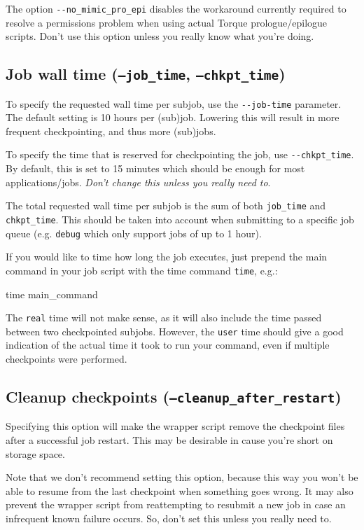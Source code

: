 The option \lstinline|--no_mimic_pro_epi| disables the workaround currently required to resolve
a permissions problem when using actual Torque prologue/epilogue scripts. Don't use
this option unless you really know what you're doing.

\subsection{Job wall time (\texttt{--job\_time}, \texttt{--chkpt\_time})}

To specify the requested wall time per subjob, use the \lstinline|--job-time| parameter.
The default setting is 10 hours per (sub)job. Lowering this will result in more
frequent checkpointing, and thus more (sub)jobs.

To specify the time that is reserved for checkpointing the job, use \lstinline|--chkpt_time|.
By default, this is set to 15 minutes which should be enough for most applications/jobs.
\emph{Don't change this unless you really need to}.

The total requested wall time per subjob is the sum of both \lstinline|job_time| and \lstinline|chkpt_time|.
This should be taken into account when submitting to a specific job queue
(e.g. \lstinline|debug| which only support jobs of up to 1 hour).

If you would like to time how long the job executes, just prepend the main command in your job script with
the time command \lstinline|time|, e.g.:

\begin{prompt}
time main_command
\end{prompt}

The \lstinline|real| time will not make sense, as it will also include the time
passed between two checkpointed subjobs. However, the \lstinline|user| time should give a good
indication of the actual time it took to run your command, even if multiple checkpoints were performed.

\subsection{Cleanup checkpoints (\texttt{--cleanup\_after\_restart})}

Specifying this option will make the wrapper script remove the checkpoint files after
a successful job restart. This may be desirable in cause you're short on storage space.

Note that we don't recommend setting this option, because this way you won't be able
to resume from the last checkpoint when something goes wrong. It may also prevent
the wrapper script from reattempting to resubmit a new job in case an infrequent known
failure occurs. So, don't set this unless you really need to.

